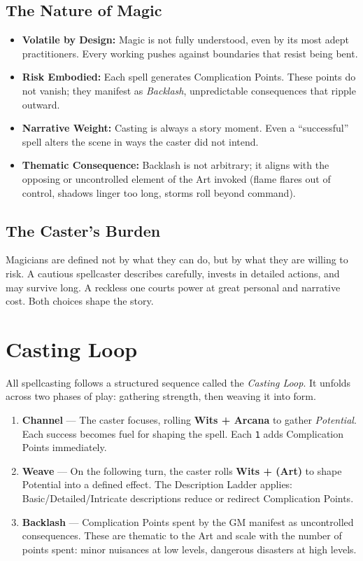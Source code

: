 \documentclass[12pt]{book}
\begin{document}
\section{The Nature of Magic}
\begin{itemize}
  \item \textbf{Volatile by Design:} Magic is not fully understood, even by its most adept practitioners. Every working pushes against boundaries that resist being bent.  
  \item \textbf{Risk Embodied:} Each spell generates Complication Points. These points do not vanish; they manifest as \emph{Backlash}, unpredictable consequences that ripple outward.  
  \item \textbf{Narrative Weight:} Casting is always a story moment. Even a “successful” spell alters the scene in ways the caster did not intend.  
  \item \textbf{Thematic Consequence:} Backlash is not arbitrary; it aligns with the opposing or uncontrolled element of the Art invoked (flame flares out of control, shadows linger too long, storms roll beyond command).  
\end{itemize}

\section{The Caster’s Burden}
Magicians are defined not by what they can do, but by what they are willing to risk.  
A cautious spellcaster describes carefully, invests in detailed actions, and may survive long. A reckless one courts power at great personal and narrative cost. Both choices shape the story.

\chapter{Casting Loop}

All spellcasting follows a structured sequence called the \emph{Casting Loop}.  
It unfolds across two phases of play: gathering strength, then weaving it into form.

\begin{enumerate}
  \item \textbf{Channel} — The caster focuses, rolling \textbf{Wits + Arcana} to gather \emph{Potential}.  
  Each success becomes fuel for shaping the spell. Each \texttt{1} adds Complication Points immediately.  
  \item \textbf{Weave} — On the following turn, the caster rolls \textbf{Wits + (Art)} to shape Potential into a defined effect.  
  The Description Ladder applies: Basic/Detailed/Intricate descriptions reduce or redirect Complication Points.  
  \item \textbf{Backlash} — Complication Points spent by the GM manifest as uncontrolled consequences.  
  These are thematic to the Art and scale with the number of points spent: minor nuisances at low levels, dangerous disasters at high levels.  
\end{enumerate}
\end{document}
